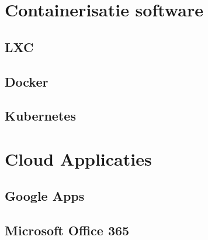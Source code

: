 \documentclass[a4paper,12pt,twoside,openright,titlepage]{book}
\begin{document}
\section{Containerisatie software}
\subsection{LXC}
\subsection{Docker}
\subsection{Kubernetes}
\section{Cloud Applicaties}
\subsection{Google Apps}
\subsection{Microsoft Office 365}

\printindex
\end{document}
